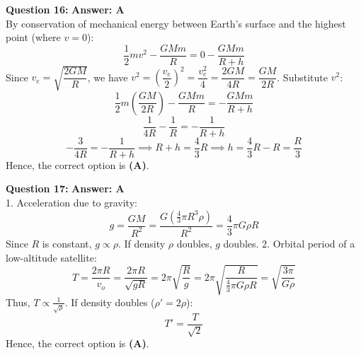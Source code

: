 \documentclass[11pt,a4paper]{article}
\begin{document}
\begin{tcolorbox}[solbox]
  \textbf{\textcolor{primaryDark}{Question 16:}} \hfill \textbf{\textcolor{l1Green}{Answer: A}}\\
  \vspace{3pt}
  By conservation of mechanical energy between Earth's surface and the highest point (where $v = 0$):
$$\frac{1}{2}m v^2 - \frac{GMm}{R} = 0 - \frac{GMm}{R + h}$$
\vspace{3pt}
Since $v_e = \sqrt{\dfrac{2GM}{R}}$, we have $v^2 = \left(\dfrac{v_e}{2}\right)^2 = \dfrac{v_e^2}{4} = \dfrac{2GM}{4R} = \dfrac{GM}{2R}$.
\vspace{3pt}
Substitute $v^2$:
$$\frac{1}{2}m \left(\frac{GM}{2R}\right) - \frac{GMm}{R} = -\frac{GMm}{R + h}$$
$$\frac{1}{4R} - \frac{1}{R} = -\frac{1}{R + h}$$
$$-\frac{3}{4R} = -\frac{1}{R + h} \implies R + h = \frac{4}{3}R \implies h = \frac{4}{3}R - R = \frac{R}{3}$$
\vspace{3pt}
Hence, the correct option is \textbf{(A)}.
\end{tcolorbox}
\vspace{3pt}

\begin{tcolorbox}[solbox]
  \textbf{\textcolor{primaryDark}{Question 17:}} \hfill \textbf{\textcolor{l1Green}{Answer: A}}\\
  \vspace{3pt}
  1. Acceleration due to gravity:
$$g = \frac{GM}{R^2} = \frac{G \left(\frac{4}{3}\pi R^3 \rho\right)}{R^2} = \frac{4}{3}\pi G \rho R$$
Since $R$ is constant, $g \propto \rho$. If density $\rho$ doubles, $g$ doubles.
\vspace{3pt}
2. Orbital period of a low-altitude satellite:
$$T = \frac{2\pi R}{v_o} = \frac{2\pi R}{\sqrt{gR}} = 2\pi \sqrt{\frac{R}{g}} = 2\pi \sqrt{\frac{R}{\frac{4}{3}\pi G \rho R}} = \sqrt{\frac{3\pi}{G\rho}}$$
Thus, $T \propto \frac{1}{\sqrt{\rho}}$. If density doubles ($\rho' = 2\rho$):
$$T' = \frac{T}{\sqrt{2}}$$
\vspace{3pt}
Hence, the correct option is \textbf{(A)}.
\end{tcolorbox}
\vspace{3pt}
\end{document}
